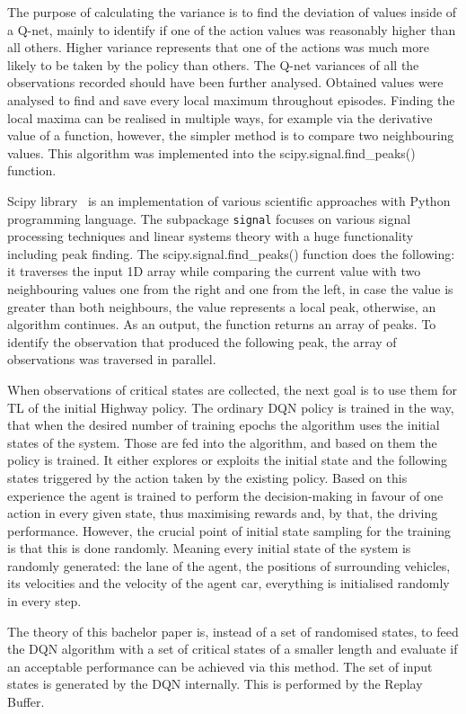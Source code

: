 The purpose of calculating the variance is to find the deviation of values inside of a Q-net, mainly to identify if one of the action values was reasonably higher than all others. Higher variance represents that one of the actions was much more likely to be taken by the policy than others. The Q-net variances of all the observations recorded should have been further analysed. Obtained values were analysed to find and save every local maximum throughout episodes. Finding the local maxima can be realised in multiple ways, for example via the derivative value of a function, however, the simpler method is to compare two neighbouring values. This algorithm was implemented into the scipy.signal.find\_peaks() function. 

Scipy library~\cite{Virtanen_2020} is an implementation of various scientific approaches with Python programming language. The subpackage \texttt{signal} focuses on various signal processing techniques and linear systems theory with a huge functionality including peak finding. The scipy.signal.find\_peaks() function does the following: it traverses the input 1D array while comparing the current value with two neighbouring values one from the right and one from the left, in case the value is greater than both neighbours, the value represents a local peak, otherwise, an algorithm continues. As an output, the function returns an array of peaks. To identify the observation that produced the following peak, the array of observations was traversed in parallel.

When observations of critical states are collected, the next goal is to use them for TL of the initial Highway policy. The ordinary DQN policy is trained in the way, that when the desired number of training epochs the algorithm uses the initial states of the system. Those are fed into the algorithm, and based on them the policy is trained. It either explores or exploits the initial state and the following states triggered by the action taken by the existing policy. Based on this experience the agent is trained to perform the decision-making in favour of one action in every given state, thus maximising rewards and, by that, the driving performance. However, the crucial point of initial state sampling for the training is that this is done randomly. Meaning every initial state of the system is randomly generated: the lane of the agent, the positions of surrounding vehicles, its velocities and the velocity of the agent car, everything is initialised randomly in every step.

The theory of this bachelor paper is, instead of a set of randomised states, to feed the DQN algorithm with a set of critical states of a smaller length and evaluate if an acceptable performance can be achieved via this method. The set of input states is generated by the DQN internally. This is performed by the Replay Buffer.

